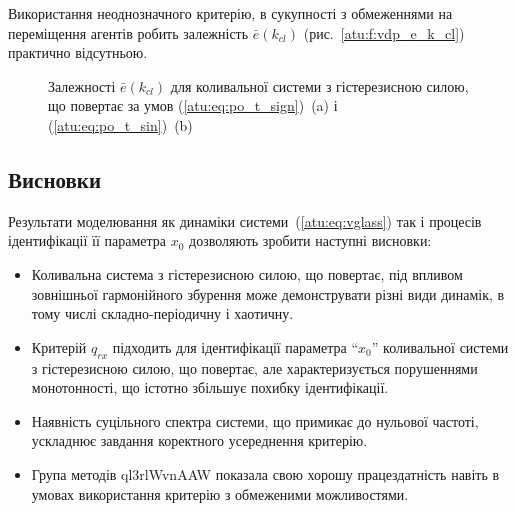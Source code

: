 Використання неоднозначного критерію, в сукупності з
обмеженнями на переміщення агентів робить залежність
$ \bar{e} (k_{cl}) $ (рис.~\ref{atu:f:vdp_e_k_cl}) практично відсутньою.


\begin{figure}[htb!]
  \caption{Залежності $\bar{e}(k_{cl})$ для коливальної системи з гістерезисною силою, що повертає за умов (\ref{atu:eq:po_t_sign})~(a) і (\ref{atu:eq:po_t_sin})~(b)}
\label{atu:f:vg_e_k_cl}
\end{figure}





\subsection{Висновки} %

Результати моделювання як динаміки системи~(\ref{atu:eq:vglass}) так і
процесів ідентифікації її параметра
$ x_0 $ дозволяють зробити наступні висновки:

\begin{itemize}

  \item
    Коливальна система з гістерезисною силою, що повертає,
    під впливом
    зовнішньої гармонійного збурення може демонструвати різні
    види динамік, в тому числі складно-періодичну і хаотичну.


  \item
    Критерій
    $ q_{rx} $ підходить для ідентифікації параметра ``$x_0$'' коливальної
    системи з гістерезисною силою, що повертає, але характеризується порушеннями
    монотонності, що істотно збільшує похибку ідентифікації.

  \item
    Наявність суцільного спектра системи, що примикає до нульової
    частоті, ускладнює завдання коректного усереднення критерію.

  \item
    Група методів ql3rlWvnAAW показала свою хорошу працездатність навіть
    в умовах використання критерію з обмеженими можливостями.


\end{itemize}


